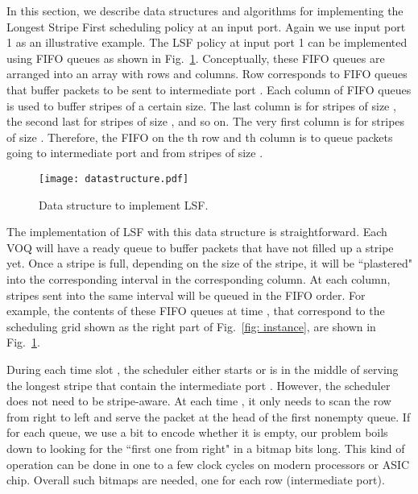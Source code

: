 In this section, we describe data structures and algorithms for implementing the Longest 
Stripe First scheduling policy at an input port.  Again we use input port 1 as an illustrative example.
The LSF policy at input port 1 can be implemented using  
FIFO queues as shown in Fig.~\ref{fig:data structure}.  Conceptually, these FIFO queues are arranged into an array with 
 rows and  columns.  Row  corresponds to FIFO queues that buffer packets 
to be sent to intermediate port .  Each column of FIFO queues is used to buffer stripes of a certain size.  
The last column is for stripes of size , the second last for stripes of size , and so on.  
The very first column is for stripes of size .  Therefore, the FIFO on the th row and th column
is to queue packets going to intermediate port  and from stripes of size
.

\begin{figure}[htb]
  \centering
    \texttt{[image: datastructure.pdf]}
    \caption{Data structure to implement LSF.}
\label{fig:data structure}
\end{figure}



The implementation of LSF with this data structure is straightforward.  Each VOQ will have a ready queue 
to buffer packets that have not filled up a stripe yet.  Once a stripe is full, depending on the size of the stripe, 
it will be ``plastered" into the corresponding interval in the corresponding column.  At each column,
stripes sent into the same interval will be queued in the FIFO order.  For example, the contents of 
these FIFO queues at time , that correspond to the scheduling grid shown as the right part of Fig.~\ref{fig: instance}, 
are shown in Fig.~\ref{fig:data structure}.

During each time slot , the scheduler either starts or is in the middle of serving the longest stripe that contain the intermediate
port .  However, the scheduler 
does not need to be stripe-aware.  At each time , it only needs to scan the  row 
from right to left and serve the packet at the head of the first nonempty queue.  If for each queue, we use a bit to encode whether it
is empty, our problem boils down to looking for the ``first one from right" in a bitmap  bits long.  This kind of operation
can be done in one to a few clock cycles on modern processors or ASIC chip.  Overall  such bitmaps are needed, one for each 
row (intermediate port).

